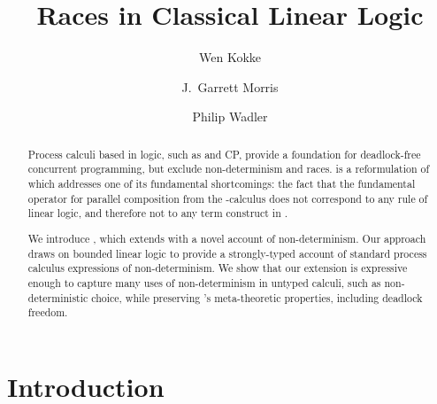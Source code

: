 \documentclass[UKenglish]{llncs}
\title{Races in Classical Linear Logic}
\author{Wen Kokke \and J.\ Garrett Morris \and Philip Wadler}
\institute{University of Edinburgh, Edinburgh, UK,\\
\email{wen.kokke@ed.ac.uk}}
\begin{document}
\maketitle %

\begin{abstract}
  Process calculi based in logic, such as \piDILL and CP, provide a foundation for deadlock-free concurrent programming, but exclude non-determinism and races.
  \dhcp is a reformulation of \cp which addresses one of its fundamental shortcomings: the fact that the fundamental operator for parallel composition from the \textpi-calculus does not correspond to any rule of linear logic, and therefore not to any term construct in \cp.

  We introduce \nodcap, which extends \dhcp with a novel account of non-determinism.
  Our approach draws on bounded linear logic to provide a strongly-typed account of standard process calculus expressions of non-determinism. We show that our extension is expressive enough to capture many uses of non-determinism in untyped calculi, such as non-deterministic choice, while preserving \dhcp's meta-theoretic properties, including deadlock freedom.  
\end{abstract}

\section{Introduction}\label{sec:introduction}
\end{document}
